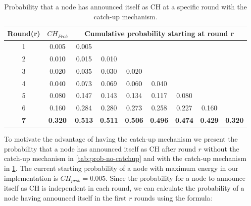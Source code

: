     
\begin{table}[bt]
\centering
\caption{Probability that a node has announced itself as CH at a specific round with the catch-up mechanism.}
\label{tab:prob-catchup}
\begin{tabular}{|c|c|c|cccccc|}
\hline
\textbf{Round(r)} & \textbf{$CH_{Prob}$} & \multicolumn{7}{c|}{\textbf{Cumulative probability starting at round r}}                                                                                       \\ \hline
1                 & 0.005                & 0.005 &                            &                            &                            &                            &                            &       \\ \cline{1-4}
2                 & 0.010                & 0.015 & \multicolumn{1}{c|}{0.010} &                            &                            &                            &                            &       \\ \cline{1-5}
3                 & 0.020                & 0.035 & \multicolumn{1}{c|}{0.030} & \multicolumn{1}{c|}{0.020} &                            &                            &                            &       \\ \cline{1-6}
4                 & 0.040                & 0.073 & \multicolumn{1}{c|}{0.069} & \multicolumn{1}{c|}{0.060} & \multicolumn{1}{c|}{0.040} &                            &                            &       \\ \cline{1-7}
5                 & 0.080                & 0.147 & \multicolumn{1}{c|}{0.143} & \multicolumn{1}{c|}{0.134} & \multicolumn{1}{c|}{0.117} & \multicolumn{1}{c|}{0.080} &                            &       \\ \cline{1-8}
6                 & 0.160                & 0.284 & \multicolumn{1}{c|}{0.280} & \multicolumn{1}{c|}{0.273} & \multicolumn{1}{c|}{0.258} & \multicolumn{1}{c|}{0.227} & \multicolumn{1}{c|}{0.160} &       \\ \hline
\textbf{7}                 & \textbf{0.320}                & \textbf{0.513} & \multicolumn{1}{c|}{\textbf{0.511}} & \multicolumn{1}{c|}{\textbf{0.506}} & \multicolumn{1}{c|}{\textbf{0.496}} & \multicolumn{1}{c|}{\textbf{0.474}} & \multicolumn{1}{c|}{\textbf{0.429}} & \textbf{0.320} \\ \hline
\end{tabular}
\end{table}


To motivate the advantage of having the catch-up mechanism we present the probability that a node has announced itself as CH after round $r$ without the catch-up mechanism in \cref{tab:prob-no-catchup} and with the catch-up mechanism in \cref{tab:prob-catchup}. The current starting probability of a node with maximum energy in our implementation is $CH_{prob} = 0.005$. Since the probability for a node to announce itself as CH is independent in each round, we can calculate the probability of a node having announced itself in the first $r$ rounds using the formula:

